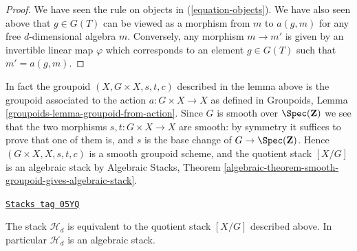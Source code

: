 \begin{proof}
We have seen the rule on objects in (\ref{equation-objects}).
We have also seen above that $g \in G(T)$ can be viewed as
a morphism from $m$ to $a(g, m)$ for any free $d$-dimensional algebra $m$.
Conversely, any morphism $m \to m'$ is given by an invertible linear
map $\varphi$ which corresponds to an element $g \in G(T)$ such
that $m' = a(g, m)$.
\end{proof}

In fact the groupoid $(X, G \times X, s, t, c)$ described in the
lemma above is the groupoid associated to the action $a : G \times X \to X$
as defined in
Groupoids, Lemma \ref{groupoids-lemma-groupoid-from-action}.
Since $G$ is smooth over $\Spec(\mathbf{Z})$
we see that the two morphisms $s, t : G \times X \to X$ are
smooth: by symmetry it suffices to prove that one of them is, and
$s$ is the base change of $G \to \Spec(\mathbf{Z})$.
Hence $(G \times X, X, s, t, c)$ is a smooth groupoid scheme,
and the quotient stack $[X/G]$ is an algebraic stack by
Algebraic Stacks,
Theorem \ref{algebraic-theorem-smooth-groupoid-gives-algebraic-stack}.

\begin{proposition}
\label{criteria-proposition-finite-hilbert-point}
\href{https://stacks.math.columbia.edu/tag/05YQ}{\texttt{Stacks tag 05YQ}}

The stack $\mathcal{H}_d$ is equivalent to the quotient stack
$[X/G]$ described above. In particular $\mathcal{H}_d$ is an
algebraic stack.
\end{proposition}

